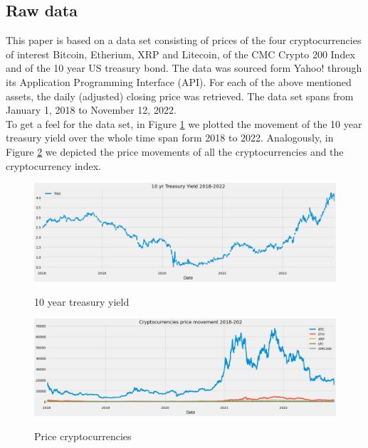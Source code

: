 \subsection{Raw data}
This paper is based on a data set consisting of prices of the four cryptocurrencies of interest Bitcoin, Etherium, XRP and Litecoin, of the CMC Crypto 200 Index and of the 10 year US treasury bond. The data was sourced form Yahoo! through its Application Programming Interface (API). For each of the above mentioned assets, the daily (adjusted) closing price was retrieved. The data set spans from January 1, 2018 to November 12, 2022.\\

To get a feel for the data set, in Figure \ref{fig:mov_treasury} we plotted the movement of the 10 year treasury yield over the whole time span form 2018 to 2022. Analogously, in Figure \ref{fig:mov_crypto} we depicted the price movements of all the cryptocurrencies and the cryptocurrency index.

\begin{figure}[!h]
    \centering
    \caption{10 year treasury yield}
    \includegraphics[width=\textwidth,height=\textheight,keepaspectratio]{images/movement_treasury.png}
    \label{fig:mov_treasury}
\end{figure}

\begin{figure}[!h]
    \centering
    \caption{Price cryptocurrencies}
    \includegraphics[width=\textwidth,height=\textheight,keepaspectratio]{images/movement_crypto.png}
    \label{fig:mov_crypto}
\end{figure}

